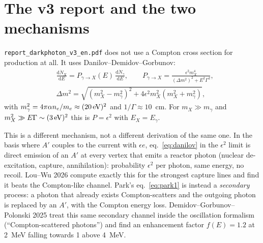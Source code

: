 \documentclass[11pt,a4paper]{article}
\newcommand{\Ap}{A'}
\newcommand{\eps}{\epsilon}
\newcommand{\dd}{\mathrm{d}}
\begin{document}
\section{The v3 report and the two mechanisms}
\label{sec:two}
\texttt{report\_darkphoton\_v3\_en.pdf} does not use a Compton cross section for production at all. It uses
Danilov--Demidov--Gorbunov:
\begin{equation}
\begin{aligned}
&\frac{\dd\dot N_X}{\dd E}=P_{\gamma\to X}(E)\,\frac{\dd\dot N_\gamma}{\dd E},\qquad
P_{\gamma\to X}=\frac{\eps^2m_X^4}{(\Delta m^2)^2+E^2\Gamma^2},\\
&\Delta m^2=\sqrt{(m_X^2-m_\gamma^2)^2+4\eps^2m_X^2(m_X^2+m_\gamma^2)},
\end{aligned}
\label{eq:danilov}
\end{equation}
with $m_\gamma^2=4\pi\alpha n_e/m_e\approx(20\,{\rm eV})^2$ and $1/\Gamma\approx10$~cm. For $m_X\gg m_\gamma$ and
$m_X^2\gg E\Gamma\sim(3\,{\rm eV})^2$ this is $P=\eps^2$ with $E_X=E_\gamma$.

This is a different mechanism, not a different derivation of the same one. In the basis where $\Ap$ couples to the
current with $\eps e$, eq.~\eqref{eq:danilov} in the $\eps^2$ limit is direct emission of an $\Ap$ at every vertex that
emits a reactor photon (nuclear de-excitation, capture, annihilation): probability $\eps^2$ per photon, same energy,
no recoil. Lou--Wu 2026 compute exactly this for the strongest capture lines and find it beats the Compton-like
channel. Park's eq.~\eqref{eq:park1} is instead a \emph{secondary} process: a photon that already exists Compton-scatters
and the outgoing photon is replaced by an $\Ap$, with the Compton energy loss. Demidov--Gorbunov--Polonski 2025 treat
this same secondary channel inside the oscillation formalism (``Compton-scattered photons'') and find an enhancement
factor $f(E)=1.2$ at 2~MeV falling towards 1 above 4~MeV.
\end{document}
